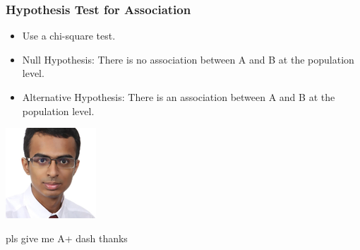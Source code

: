 \documentclass[10pt, landscape]{article}
\begin{document}
\begin{multicols*}{3}
\subsubsection{Hypothesis Test for Association}
\begin{itemize}
    \item Use a chi-square test.
    \item Null Hypothesis: There is no association between A and B at the population level.
    \item Alternative Hypothesis: There is an association between A and B at the population level.
\end{itemize}

\begin{center}
    \includegraphics[width=0.5\linewidth]{dash.png}
    \item pls give me A+ dash thanks
\end{center}

\end{multicols*}
\end{document}
